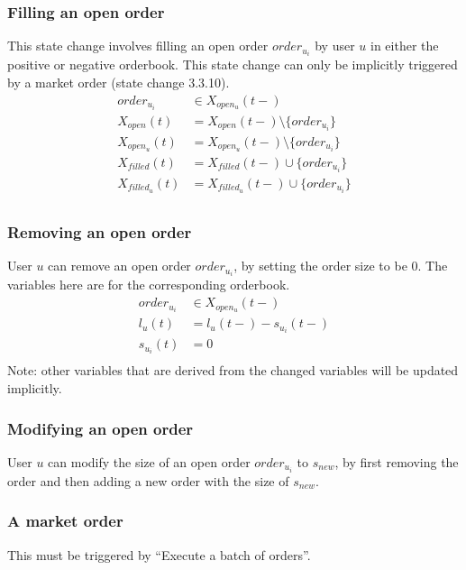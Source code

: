 \documentclass{article}%
\begin{document}
\subsubsection{Filling an open order}
This state change involves filling an open order $order_{u_i}$ by user $u$ in either the positive or negative orderbook. This state change can only be implicitly triggered by a market order (state change 3.3.10).
    \begin{align*}
        order_{u_i} &\in X_{open_{u}}(t-) \\
        X_{open}(t) &= X_{open}(t-) \setminus \{ order_{u_i} \}\\
        X_{open_{u}}(t) &= X_{open_{u}}(t-) \setminus \{ order_{u_i} \}\\
        X_{filled}(t) &= X_{filled}(t-) \cup \{ order_{u_i} \}\\
        X_{filled_{u}}(t) &= X_{filled_{u}}(t-) \cup \{ order_{u_i} \}\\
    \end{align*}

\subsubsection{Removing an open order}
User $u$ can remove an open order $order_{u_i}$, by setting the order size to be $0$. The variables here are for the corresponding orderbook.
    \begin{align*}
        order_{u_i} &\in X_{open_{u}}(t-) \\
        l_u(t) &= l_u(t-) - s_{u_i}(t-) \\
        s_{u_i}(t) &= 0 \\
    \end{align*}
Note: other variables that are derived from the changed variables will be updated implicitly.

\subsubsection{Modifying an open order}
User $u$ can modify the size of an open order $order_{u_i}$ to $s_{new}$, by first removing the order and then adding a new order with the size of $s_{new}$.

\subsubsection{A market order}
This must be triggered by ``Execute a batch of orders''.
\end{document}
